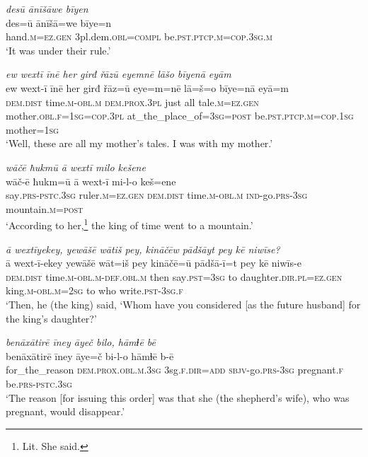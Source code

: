 \ea \label{ŠJ.103}
\textit{desū ānīšāwe bīyen} \\ 
\gll des=ū ānīšā=we bīye=n \\ 
 hand\textsc{.m}\textsc{=ez.gen} 3pl.dem\textsc{.obl}\textsc{=compl} be\textsc{.pst}\textsc{.ptcp}\textsc{.m}\textsc{=cop}\textsc{.3sg}\textsc{.m} \\ 
\glt `It was under their rule.'
\z 
 
\ea \label{KŠ.1}
\textit{ew wextī īnē her girđ řāzū eyemnē lāšo bīyenā eyām} \\ 
\gll ew wext-ī īnē her girđ řāz=ū eye=m=nē lā=š=o bīye=nā eyā=m \\ 
 \textsc{dem.dist} time\textsc{.m}\textsc{-obl}\textsc{.m} \textsc{dem.prox}\textsc{.3pl} just all tale\textsc{.m}\textsc{=ez.gen} mother\textsc{.obl}\textsc{.f}\textsc{=\textsc{1sg}}\textsc{=cop}\textsc{.3pl} at\_the\_place\_of\textsc{=3sg}\textsc{=\textsc{post}} be\textsc{.pst}\textsc{.ptcp}\textsc{.m}\textsc{=cop}\textsc{.\textsc{1sg}} mother\textsc{=\textsc{1sg}} \\ 
\glt `Well, these are all my mother’s tales. I was with my mother.'
\z 
 
\ea \label{KŠ.3}
\textit{wāčē ħukmū ā wextī milo kešene} \\ 
\gll wāč-ē ħukm=ū ā wext-ī mi-l-o keš=ene \\ 
 say\textsc{.prs}\textsc{-pstc}\textsc{.3sg} ruler\textsc{.m}\textsc{=ez.gen} \textsc{dem.dist} time\textsc{.m}\textsc{-obl}\textsc{.m} \textsc{ind-}go\textsc{.prs}\textsc{-3sg} mountain\textsc{.m}\textsc{=\textsc{post}} \\ 
\glt `According to her,\footnote{Lit. She said.} the king of time went to a mountain.'
\z 
 
\ea \label{KŠ.15}
\textit{ā wextīyekey, yewāšē wātiš pey, kināčēw pādšāyt pey kē niwīse?} \\ 
\gll ā wext-ī-ekey yewāšē wāt=iš pey kināčē=ū pādšā-ī=t pey kē niwīs-e \\ 
 \textsc{dem.dist} time\textsc{.m}\textsc{-obl}\textsc{.m}\textsc{-def}\textsc{.obl}\textsc{.m} then say\textsc{.pst}\textsc{=3sg} to daughter\textsc{.dir}\textsc{.pl}\textsc{=ez.gen} king\textsc{.m}\textsc{-obl}\textsc{.m}\textsc{=\textsc{2sg}} to who write\textsc{.pst}\textsc{-3sg}\textsc{.f} \\ 
\glt `Then, he (the king) said, ‘Whom have you considered [as the future husband] for the king’s daughter?'
\z 
 
\ea \label{KŠ.18}
\textit{benāxātirē īney āyeč bilo, hāmɫē bē} \\ 
\gll benāxātirē īney āye=č bi-l-o hāmɫē b-ē \\ 
 for\_the\_reason \textsc{dem.prox}\textsc{.obl}\textsc{.m}\textsc{.3sg} 3sg\textsc{.f}\textsc{.dir}\textsc{=add} \textsc{sbjv-}go\textsc{.prs}\textsc{-3sg} pregnant\textsc{.f} be\textsc{.prs}\textsc{-pstc}\textsc{.3sg} \\ 
\glt `The reason [for issuing this order] was that she (the shepherd’s wife), who was pregnant, would disappear.'
\z 
 
